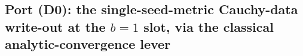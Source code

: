 
\subsection*{Port (D0): the single-seed-metric Cauchy-data write-out at the
$b=1$ slot, via the classical analytic-convergence lever}

